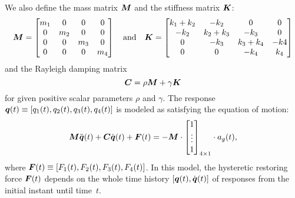 We also define the mass matrix $\mbox{\boldmath$ M $}$ and the stiffness matrix $\mbox{\boldmath$ K $}$:
\begin{equation*}
\bv{M}= 
\begin{bmatrix}
  m_1 & 0   & 0   & 0 \\
  0   & m_2 & 0   & 0 \\
  0   & 0   & m_3 & 0 \\
  0   & 0   & 0   & m_4 \\
\end{bmatrix}
%
\quad \text{and} \quad
%
\bv{K}= 
\begin{bmatrix}
  k_1 + k_2 & -k_2    & 0       & 0 \\
  -k_2      & k_2+k_3 & -k_3    & 0 \\
  0         & -k_3    & k_3+k_4 & -k4 \\
  0         &   0     & -k_4    & k_4 \\ 
\end{bmatrix}
\end{equation*}
and the Rayleigh damping matrix
\begin{equation*}
\mbox{\boldmath$ C $} = \rho \mbox{\boldmath$ M $} + \gamma \mbox{\boldmath$ K $} 
\end{equation*}
for given positive scalar parameters $\rho$ and $\gamma$. The response $\mbox{\boldmath$ q $}(t) \equiv [q_1(t),q_2(t),q_3(t),q_4(t)]$ is modeled as satisfying the equation of motion:
\begin{equation}\label{eq:hyst:motion}
\mbox{\boldmath$ M $} \ddot{\mbox{\boldmath$ q $}}(t) + \mbox{\boldmath$ C $} \dot{\mbox{\boldmath$ q $}}(t) + \mbox{\boldmath$ F $}(t) = -\mbox{\boldmath$ M $}\cdot 
\begin{bmatrix} 
1 \\ 
\vdots \\
1
\end{bmatrix}_{4\times1} \cdot a_g(t),
\end{equation}
where $\mbox{\boldmath$ F $}(t) \equiv [F_1(t), F_2(t), F_3(t), F_4(t)]$. In this model, the hysteretic restoring force $\mbox{\boldmath$ F $}(t)$ depends on the whole
time history $[\mbox{\boldmath$ q $}(t),\dot{\mbox{\boldmath$ q $}}(t)]$ of responses from the initial instant until time~$t$.


